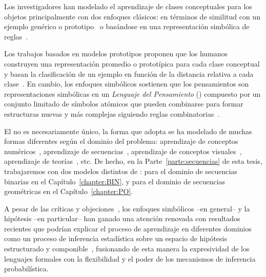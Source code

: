 Los investigadores han modelado el aprendizaje de clases conceptuales para los objetos principalmente con dos enfoques clásicos: en términos de similitud con un ejemplo genérico o prototipo~\cite{rosch1999principles, nosofsky1986attention, rosch1976structural, rosch1975family} o basándose en una representación simbólica de reglas~\cite{boole1854investigation, fodor1975language, gentner1983structure}.

Los trabajos basados en modelos prototipos proponen que los humanos construyen una representación promedio o prototípica para cada clase conceptual y basan la clasificación de un ejemplo en función de la distancia relativa a cada clase~\cite{wilson2001encyclopedia}. En cambio, los enfoques simbólicos sostienen que los pensamientos son representaciones simbólicas en un \textit{Lenguaje del Pensamiento} (\lot) compuesto por un conjunto limitado de símbolos atómicos que pueden combinarse para formar estructuras nuevas y más complejas siguiendo reglas combinatorias~\cite{fodor1975language,nosofsky1994rule, tenenbaum2011grow, maddox1993comparing}. 

El \lot no es necesariamente único, la forma que adopta se ha modelado de muchas formas diferentes según el dominio del problema: aprendizaje de conceptos numéricos~\cite{piantadosi2012bootstrapping}, aprendizaje de secuencias~\cite{amalric2017language, yildirim2015learning, romano2013language}, aprendizaje de conceptos visuales~\cite{ellis2015unsupervised}, aprendizaje de teorías~\cite{ullman2012theory}, etc. De hecho, en la Parte~\ref{parte:secuencias} de esta tesis, trabajaremos con dos modelos distintos de \lot: para el dominio de secuencias binarias en el Capítulo~\ref{chapter:BIN}, y para el dominio de secuencias geométricas en el Capítulo~\ref{chapter:PO}.

A pesar de las críticas y objeciones~\cite{blackburn1984spreading,loewer1991meaning,knowles1998language,aydede1997language,wilson2001encyclopedia}, los enfoques simbólicos --en general-- y la hipótesis \lot{ }--en particular-- han ganado una atención renovada con resultados recientes que podrían explicar el proceso de aprendizaje en diferentes dominios como un proceso de inferencia estadística sobre un espacio de hipótesis estructurado y componible~\cite{tenenbaum2011grow,piantadosi2016four}, fusionando de esta manera la expresividad de los lenguajes formales con la flexibilidad y el poder de los mecanismos de inferencia probabilística.

